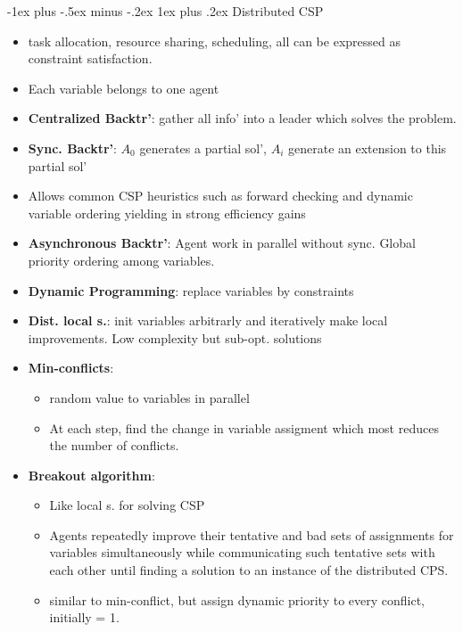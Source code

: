 \documentclass[10pt,a4paper,landscape]{article}
\makeatletter
\renewcommand{\subsubsection}{\@startsection{subsubsection}{3}{0mm}%
                                {-1ex plus -.5ex minus -.2ex}%
                                {1ex plus .2ex}%
                                {\normalfont\tiny\bfseries}}
\makeatother
\begin{document}
\begin{multicols*}{5}
\subsubsection{Distributed CSP}
\begin{itemize}
 	\item  task allocation, resource sharing, scheduling, all can be expressed as constraint satisfaction. 
 	\item Each variable belongs to one agent
 	\item \textbf{Centralized Backtr'}: gather all info' into a leader which solves the problem.
 	\item \textbf{Sync. Backtr'}: $A_0$ generates a partial sol',
	$A_i$ generate an extension to this partial sol'
 	\item Allows common CSP heuristics such as forward checking and dynamic variable ordering yielding in strong efficiency gains
 	\item \textbf{Asynchronous Backtr'}: Agent work in parallel without sync. Global priority ordering among variables.
 	\item \textbf{Dynamic Programming}: replace variables by constraints 
 	\item \textbf{Dist. local s.}: init variables arbitrarly and iteratively make local improvements. Low complexity but sub-opt. solutions

 	\item \textbf{Min-conflicts}: 
 	\begin{itemize}
 		\item random value to variables in parallel 
 		\item At each step, find the change in variable assigment which most reduces the number of conflicts.
 	\end{itemize}
 	\item \textbf{Breakout algorithm}:
 	\begin{itemize}
 		\item Like local s. for solving CSP
 		\item Agents repeatedly improve their tentative and bad sets of assignments for variables simultaneously while communicating such tentative sets with each other until finding a solution to an instance of the distributed CPS.
 	 	\item similar to min-conflict, but assign dynamic priority to every conflict, initially = 1.
 	\end{itemize}	
\end{itemize}


\end{multicols*}
\end{document}
